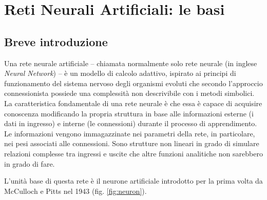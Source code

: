 \chapter{Reti Neurali Artificiali: le basi} %
\label{Capitolo1} %
\def \path {Figures/C1}
\def \teoria {Figures/teoria}


\section{Breve introduzione}
\label{sec:intro}
Una rete neurale artificiale – chiamata normalmente solo rete neurale (in inglese \emph{Neural Network}) – è
un modello di calcolo adattivo, ispirato ai principi di funzionamento del sistema nervoso degli organismi evoluti che secondo l'approccio connessionista \parencite{WConnessionismo} possiede una complessità non descrivibile con i metodi simbolici.  
La caratteristica fondamentale di una rete neurale è che essa è capace di acquisire conoscenza modificando la propria struttura in base alle informazioni esterne (i dati in ingresso) e interne (le connessioni) durante il processo di apprendimento. Le informazioni vengono immagazzinate nei parametri della rete, in particolare, nei pesi associati alle connessioni. 
Sono strutture non lineari in grado di simulare relazioni complesse tra ingressi e uscite che altre funzioni analitiche non sarebbero in grado di fare. 


L'unità base di questa rete è il neurone artificiale introdotto per la prima volta da McCulloch e
Pitts nel 1943 (fig. \ref{fig:neuron}).


